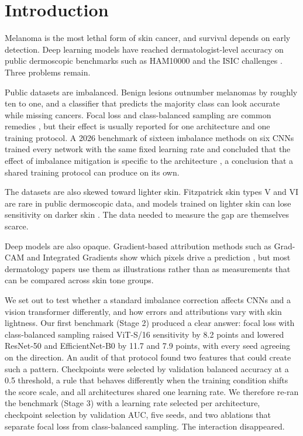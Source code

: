 \section{Introduction}

Melanoma is the most lethal form of skin cancer, and survival depends on early detection. Deep learning models have reached dermatologist-level accuracy on public dermoscopic benchmarks such as HAM10000 and the ISIC challenges \citep{tschandl2018ham10000,codella2018isic}. Three problems remain.

Public datasets are imbalanced. Benign lesions outnumber melanomas by roughly ten to one, and a classifier that predicts the majority class can look accurate while missing cancers. Focal loss and class-balanced sampling are common remedies \citep{lin2017focal}, but their effect is usually reported for one architecture and one training protocol. A 2026 benchmark of sixteen imbalance methods on six CNNs trained every network with the same fixed learning rate and concluded that the effect of imbalance mitigation is specific to the architecture \citep{ahmad2026imbalance}, a conclusion that a shared training protocol can produce on its own.

The datasets are also skewed toward lighter skin. Fitzpatrick skin types V and VI are rare in public dermoscopic data, and models trained on lighter skin can lose sensitivity on darker skin \citep{groh2021fitzpatrick17k,daneshjou2022ddi,ruga2026pipsqueak}. The data needed to measure the gap are themselves scarce.

Deep models are also opaque. Gradient-based attribution methods such as Grad-CAM and Integrated Gradients show which pixels drive a prediction \citep{selvaraju2017gradcam,sundararajan2017ig}, but most dermatology papers use them as illustrations rather than as measurements that can be compared across skin tone groups.

We set out to test whether a standard imbalance correction affects CNNs and a vision transformer differently, and how errors and attributions vary with skin lightness. Our first benchmark (Stage 2) produced a clear answer: focal loss with class-balanced sampling raised ViT-S/16 sensitivity by 8.2 points and lowered ResNet-50 and EfficientNet-B0 by 11.7 and 7.9 points, with every seed agreeing on the direction. An audit of that protocol found two features that could create such a pattern. Checkpoints were selected by validation balanced accuracy at a 0.5 threshold, a rule that behaves differently when the training condition shifts the score scale, and all architectures shared one learning rate. We therefore re-ran the benchmark (Stage 3) with a learning rate selected per architecture, checkpoint selection by validation AUC, five seeds, and two ablations that separate focal loss from class-balanced sampling. The interaction disappeared.

